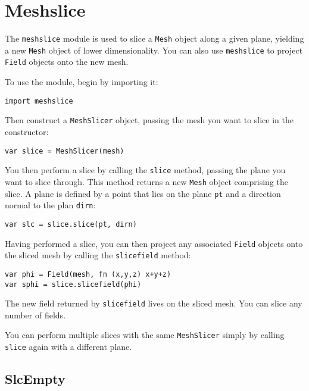 \hypertarget{meshslice}{%
\section{Meshslice}\label{meshslice}}

The \texttt{meshslice} module is used to slice a \texttt{Mesh} object
along a given plane, yielding a new \texttt{Mesh} object of lower
dimensionality. You can also use \texttt{meshslice} to project
\texttt{Field} objects onto the new mesh.

To use the module, begin by importing it:

\begin{lstlisting}
import meshslice 
\end{lstlisting}

Then construct a \texttt{MeshSlicer} object, passing the mesh you want
to slice in the constructor:

\begin{lstlisting}
var slice = MeshSlicer(mesh)
\end{lstlisting}

You then perform a slice by calling the \texttt{slice} method, passing
the plane you want to slice through. This method returns a new
\texttt{Mesh} object comprising the slice. A plane is defined by a point
that lies on the plane \texttt{pt} and a direction normal to the plan
\texttt{dirn}:

\begin{lstlisting}
var slc = slice.slice(pt, dirn)
\end{lstlisting}

Having performed a slice, you can then project any associated
\texttt{Field} objects onto the sliced mesh by calling the
\texttt{slicefield} method:

\begin{lstlisting}
var phi = Field(mesh, fn (x,y,z) x+y+z)
var sphi = slice.slicefield(phi)
\end{lstlisting}

The new field returned by \texttt{slicefield} lives on the sliced mesh.
You can slice any number of fields.

You can perform multiple slices with the same \texttt{MeshSlicer} simply
by calling \texttt{slice} again with a different plane.

\hypertarget{slcempty}{%
\subsection{SlcEmpty}\label{slcempty}}

